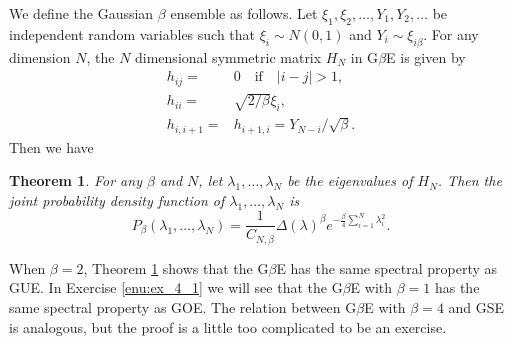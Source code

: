 \documentclass[11pt, a4paper]{article}
\numberwithin{equation}{section}
\newtheorem{thm}{Theorem}
\theoremstyle{definition}
\theoremstyle{remark}
\begin{document}
We define the Gaussian $\beta$ ensemble as follows. Let $\xi_1, \xi_2, \dotsc, Y_1, Y_2, \dotsc$ be independent random variables such that $\xi_i \sim N(0, 1)$ and $Y_i \sim \xi_{i\beta}$. For any dimension $N$, the $N$ dimensional symmetric matrix $H_N$ in G$\beta$E is given by
\begin{align}
  h_{ij} = {}& 0 \quad \text{if} \quad \lvert i - j \rvert > 1, \\
  h_{ii} = {}& \sqrt{2/\beta} \xi_i, \label{eq:defn_h_ii} \\
  h_{i, i + 1} = {}& h_{i + 1, i} = Y_{N - i}/\sqrt{\beta}. \label{eq:defn_h_ii+1} 
\end{align}
Then we have
\begin{thm} \label{thm:Edelman_Dumitriu}
  For any $\beta$ and $N$, let $\lambda_1, \dotsc, \lambda_N$ be the eigenvalues of $H_N$. Then the joint probability density function of $\lambda_1, \dotsc, \lambda_N$ is
  \begin{equation}
    P_{\beta}(\lambda_1, \dotsc, \lambda_N) = \frac{1}{C_{N, \beta}} \Delta(\lambda)^{\beta} e^{-\frac{\beta}{4} \sum^N_{i = 1} \lambda^2_i}.
  \end{equation}
\end{thm}
When $\beta = 2$, Theorem \ref{thm:Edelman_Dumitriu} shows that the G$\beta$E has the same spectral property as GUE. In Exercise \ref{enu:ex_4_1} we will see that the G$\beta$E with $\beta = 1$ has the same spectral property as GOE. The relation between G$\beta$E with $\beta = 4$ and GSE is analogous, but the proof is a little too complicated to be an exercise.
\end{document}
